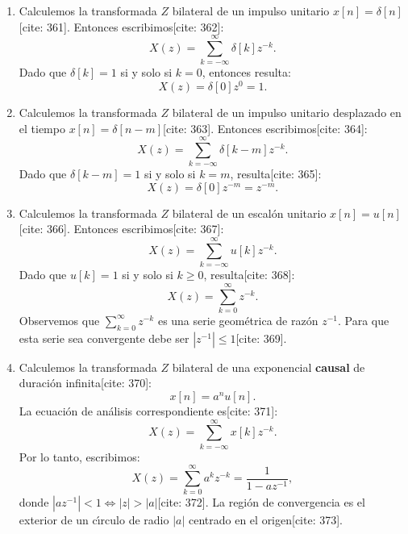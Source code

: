 \begin{enumerate}
	
	\item Calculemos la transformada $Z$ bilateral de un impulso unitario $x[n] = \delta[n]$[cite: 361]. Entonces escribimos[cite: 362]:
	\begin{equation}
		X(z) = \sum_{k=-\infty}^{\infty} \delta[k] z^{-k}.
	\end{equation}
	Dado que $\delta[k] = 1$ si y solo si $k=0$, entonces resulta:
	\begin{equation}
		X(z) = \delta[0] z^{0} = 1. 
	\end{equation}
	
	\item Calculemos la transformada $Z$ bilateral de un impulso unitario desplazado en el tiempo $x[n] = \delta[n-m]$[cite: 363]. Entonces escribimos[cite: 364]:
	\begin{equation}
		X(z) = \sum_{k=-\infty}^{\infty} \delta[k-m] z^{-k}.
	\end{equation}
	Dado que $\delta[k-m] = 1$ si y solo si $k=m$, resulta[cite: 365]:
	\begin{equation}
		X(z) = \delta[0] z^{-m} = z^{-m}.
	\end{equation}
	
	\item Calculemos la transformada $Z$ bilateral de un escal\'{o}n unitario $x[n] = u[n]$[cite: 366]. Entonces escribimos[cite: 367]:
	\begin{equation}
		X(z) = \sum_{k=-\infty}^{\infty} u[k] z^{-k}.
	\end{equation}
	Dado que $u[k] = 1$ si y solo si $k \geq 0$, resulta[cite: 368]:
	\begin{equation}
		X(z) = \sum_{k=0}^{\infty} z^{-k}.
	\end{equation}
	Observemos que $\sum_{k=0}^{\infty} z^{-k}$ es una serie geom\'{e}trica de raz\'{o}n $z^{-1}$. Para que esta serie sea convergente debe ser $|z^{-1}| \leq 1$[cite: 369].
	
	\item Calculemos la transformada $Z$ bilateral de una exponencial \textbf{causal} de duraci\'{o}n infinita[cite: 370]:
	\begin{equation}
		x[n] = a^{n} u[n].
	\end{equation}
	La ecuaci\'{o}n de an\'{a}lisis correspondiente es[cite: 371]:
	\begin{equation}
		X(z) = \sum_{k=-\infty}^{\infty} x[k] z^{-k}.
	\end{equation}
	Por lo tanto, escribimos:
	\begin{equation}
		X(z) = \sum_{k=0}^{\infty} a^k z^{-k} = \frac{1}{1-a z^{-1}},
	\end{equation}
	donde $|a z^{-1}| < 1 \Leftrightarrow |z| > |a|$[cite: 372].
	La regi\'{o}n de convergencia es el exterior de un c\'{\i}rculo de radio $|a|$ centrado en el origen[cite: 373].
	
\end{enumerate}

